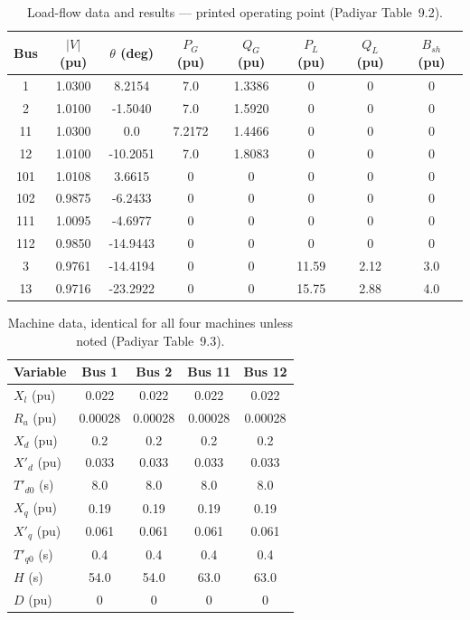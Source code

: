 \documentclass[12pt,a4paper]{article}
\begin{document}
\begin{table}[H]\centering\scriptsize
\caption{Load-flow data and results --- printed operating point (Padiyar Table~9.2).}
\begin{tabular}{cccccccc}\toprule
Bus & $|V|$ (pu) & $\theta$ (deg) & $P_G$ (pu) & $Q_G$ (pu) & $P_L$ (pu) & $Q_L$ (pu) & $B_{sh}$ (pu)\\\midrule
1   & 1.0300 & 8.2154   & 7.0     & 1.3386 & 0      & 0     & 0\\
2   & 1.0100 & -1.5040  & 7.0     & 1.5920 & 0      & 0     & 0\\
11  & 1.0300 & 0.0      & 7.2172  & 1.4466 & 0      & 0     & 0\\
12  & 1.0100 & -10.2051 & 7.0     & 1.8083 & 0      & 0     & 0\\
101 & 1.0108 & 3.6615   & 0       & 0      & 0      & 0     & 0\\
102 & 0.9875 & -6.2433  & 0       & 0      & 0      & 0     & 0\\
111 & 1.0095 & -4.6977  & 0       & 0      & 0      & 0     & 0\\
112 & 0.9850 & -14.9443 & 0       & 0      & 0      & 0     & 0\\
3   & 0.9761 & -14.4194 & 0       & 0      & 11.59  & 2.12  & 3.0\\
13  & 0.9716 & -23.2922 & 0       & 0      & 15.75  & 2.88  & 4.0\\\bottomrule
\end{tabular}\end{table}

\begin{table}[H]\centering\scriptsize
\caption{Machine data, identical for all four machines unless noted (Padiyar Table~9.3).}
\begin{tabular}{lcccc}\toprule
Variable & Bus 1 & Bus 2 & Bus 11 & Bus 12\\\midrule
$X_l$ (pu)        & 0.022   & 0.022   & 0.022   & 0.022\\
$R_a$ (pu)        & 0.00028 & 0.00028 & 0.00028 & 0.00028\\
$X_d$ (pu)        & 0.2     & 0.2     & 0.2     & 0.2\\
$X'_d$ (pu)       & 0.033   & 0.033   & 0.033   & 0.033\\
$T'_{d0}$ (s)     & 8.0     & 8.0     & 8.0     & 8.0\\
$X_q$ (pu)        & 0.19    & 0.19    & 0.19    & 0.19\\
$X'_q$ (pu)       & 0.061   & 0.061   & 0.061   & 0.061\\
$T'_{q0}$ (s)     & 0.4     & 0.4     & 0.4     & 0.4\\
$H$ (s)           & 54.0    & 54.0    & 63.0    & 63.0\\
$D$ (pu)          & 0       & 0       & 0       & 0\\\bottomrule
\end{tabular}\end{table}
\end{document}
